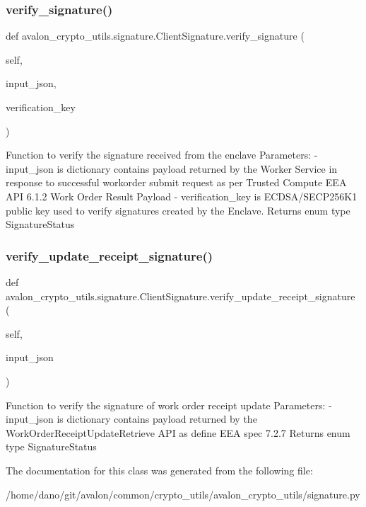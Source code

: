 \subsubsection{\texorpdfstring{verify\+\_\+signature()}{verify\_signature()}}
{\footnotesize\ttfamily def avalon\+\_\+crypto\+\_\+utils.\+signature.\+Client\+Signature.\+verify\+\_\+signature (\begin{DoxyParamCaption}\item[{}]{self,  }\item[{}]{input\+\_\+json,  }\item[{}]{verification\+\_\+key }\end{DoxyParamCaption})}

\begin{DoxyVerb}Function to verify the signature received from the enclave
Parameters:
    - input_json is dictionary contains payload returned by the
      Worker Service in response to successful workorder submit request
      as per Trusted Compute EEA API 6.1.2 Work Order Result Payload
    - verification_key is ECDSA/SECP256K1 public key used to verify
      signatures created by the Enclave.
Returns enum type SignatureStatus
\end{DoxyVerb}
 \mbox{\label{classavalon__crypto__utils_1_1signature_1_1ClientSignature_aff053b50910de8feb0e5fc112e2d17db}} 
\subsubsection{\texorpdfstring{verify\+\_\+update\+\_\+receipt\+\_\+signature()}{verify\_update\_receipt\_signature()}}
{\footnotesize\ttfamily def avalon\+\_\+crypto\+\_\+utils.\+signature.\+Client\+Signature.\+verify\+\_\+update\+\_\+receipt\+\_\+signature (\begin{DoxyParamCaption}\item[{}]{self,  }\item[{}]{input\+\_\+json }\end{DoxyParamCaption})}

\begin{DoxyVerb}Function to verify the signature of work order receipt update
Parameters:
    - input_json is dictionary contains payload returned by the
      WorkOrderReceiptUpdateRetrieve API as define EEA spec 7.2.7
Returns enum type SignatureStatus
\end{DoxyVerb}
 

The documentation for this class was generated from the following file\+:\begin{DoxyCompactItemize}
\item 
/home/dano/git/avalon/common/crypto\+\_\+utils/avalon\+\_\+crypto\+\_\+utils/signature.\+py\end{DoxyCompactItemize}
